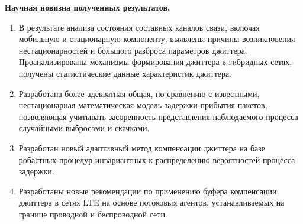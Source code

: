 \textbf{Научная новизна полученных результатов.} 
\begin{enumerate}
  \item В результате анализа состояния составных каналов связи, включая мобильную и стационарную компоненту, выявлены причины возникновения нестационарностей и большого разброса параметров джиттера.
  Проанализированы механизмы формирования джиттера в гибридных сетях, получены статистические данные характеристик джиттера.
  
 

  \item Разработана более адекватная общая, по сравнению с известными, нестационарная математическая модель задержки прибытия пакетов,
  позволяющая учитывать засоренность представления наблюдаемого процесса случайными выбросами и скачками.
  \item 
  Разработан новый адаптивный метод компенсации джиттера на базе робастных процедур инвариантных к распределению вероятностей процесса задержки.
  \item 
  Разработаны новые рекомендации по применению буфера компенсации джиттера в сетях LTE на основе потоковых агентов, устанавливаемых на границе проводной и беспроводной сети.
\end{enumerate}

